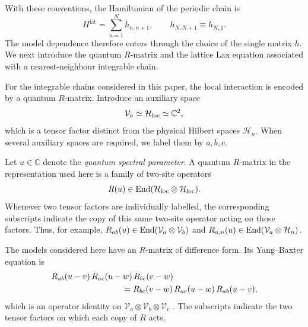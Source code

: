 With these conventions, the Hamiltonian of the periodic chain is
\begin{equation}
H^{\mathrm{lat}}
 = \sum_{n=1}^{N} h_{n,n+1},
\qquad h_{N,N+1}\equiv h_{N,1}.
\label{eq:generic-lattice-hamiltonian}
\end{equation}
The model dependence therefore enters through the choice of the single
matrix $h$.  We next introduce the quantum $R$-matrix and the lattice Lax
equation associated with a nearest-neighbour integrable chain.


For the integrable chains considered in this paper, the local interaction is
encoded by a quantum $R$-matrix.  Introduce an auxiliary space
\begin{equation}
\mathcal V_a\simeq\mathcal H_{\rm loc}\simeq\mathbb C^2,
\label{eq:auxiliary-space}
\end{equation}
which is a tensor factor distinct from the physical Hilbert spaces
$\mathcal H_n$.  When several auxiliary spaces are required, we label them by
$a,b,c$.

Let $u\in\mathbb C$ denote the \emph{quantum spectral parameter}.  A quantum
$R$-matrix in the representation used here is a family of two-site operators
\begin{equation}
R(u)\in\operatorname{End}(\mathcal H_{\rm loc}\otimes\mathcal H_{\rm loc}).
\label{eq:quantum-R-matrix-definition}
\end{equation}
Whenever two tensor factors are individually labelled, the corresponding
subscripts indicate the copy of this same two-site operator acting on those
factors.  Thus, for example,
$R_{ab}(u)\in\operatorname{End}(\mathcal V_a\otimes\mathcal V_b)$ and
$R_{a,n}(u)\in\operatorname{End}(\mathcal V_a\otimes\mathcal H_n)$.

The models considered here have an $R$-matrix of difference form.  Its
Yang--Baxter equation is
\begin{align}
&R_{ab}(u-v)\,R_{ac}(u-w)\,R_{bc}(v-w)
\nonumber\\
&\hspace{30mm}=
R_{bc}(v-w)\,R_{ac}(u-w)\,R_{ab}(u-v),
\label{eq:quantum-yang-baxter}
\end{align}
which is an operator identity on
$\mathcal V_a\otimes\mathcal V_b\otimes\mathcal V_c$
\cite{Faddeev1996}.  The subscripts indicate the two tensor factors on which
each copy of $R$ acts.

